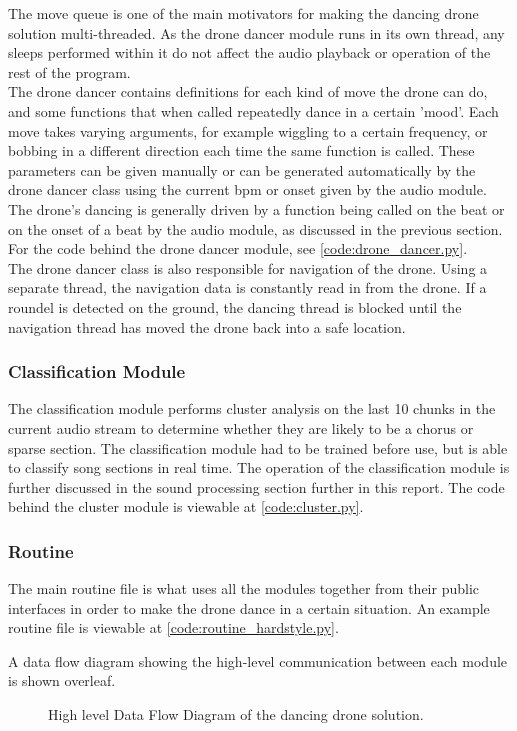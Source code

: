 The move queue is one of the main motivators for making the dancing drone solution multi-threaded. As the drone
dancer module runs in its own thread, any sleeps performed within it do not affect the audio playback or
operation of the rest of the program.\\

The drone dancer contains definitions for each kind of move the drone can do, and some functions that when called
repeatedly dance in a certain 'mood'. Each move takes varying arguments, for example wiggling to a certain
frequency, or bobbing in a different direction each time the same function is called. These parameters can be
given manually or can be generated automatically by the drone dancer class using the current bpm or onset given by the
audio module. The drone's dancing is generally driven by a function being called on the beat or on the onset of a
beat by the audio module, as discussed in the previous section. For the code behind the drone dancer module, see
\eqref{code:drone_dancer.py}.\\

The drone dancer class is also responsible for navigation of the drone. Using a separate thread, the navigation
data is constantly read in from the drone. If a roundel is detected on the ground, the dancing thread is blocked
until the navigation thread has moved the drone back into a safe location.\\

\subsubsection{Classification Module}
The classification module performs cluster analysis on the last 10 chunks in the current audio stream to
determine whether they are likely to be a chorus or sparse section. The classification module had to be trained before
use, but is able to classify song sections in real time. The operation of the classification module is further
discussed in the sound processing section further in this report. The code behind the cluster module is viewable
at \eqref{code:cluster.py}.\\

\subsubsection{Routine}
The main routine file is what uses all the modules together from their public interfaces in order to make the
drone dance in a certain situation. An example routine file is viewable at \eqref{code:routine_hardstyle.py}.

A data flow diagram showing the high-level communication between each module is shown overleaf.

\onecolumn
\begin{figure*}[h]

\caption{High level Data Flow Diagram of the dancing drone solution.}
\end{figure*}

\begin{multicols}{2}
\twocolumn

\end{multicols}
\clearpage
